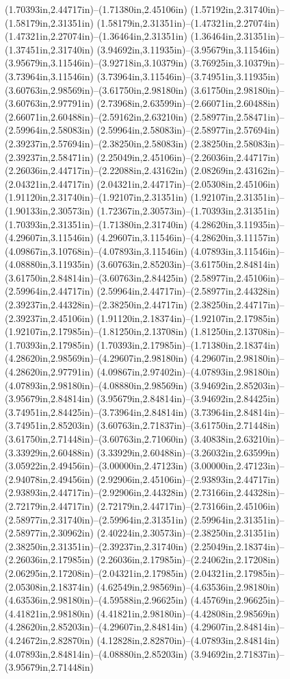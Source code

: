 (1.70393in,2.44717in)--(1.71380in,2.45106in) (1.57192in,2.31740in)--(1.58179in,2.31351in) (1.58179in,2.31351in)--(1.47321in,2.27074in) (1.47321in,2.27074in)--(1.36464in,2.31351in) (1.36464in,2.31351in)--(1.37451in,2.31740in) (3.94692in,3.11935in)--(3.95679in,3.11546in) (3.95679in,3.11546in)--(3.92718in,3.10379in) (3.76925in,3.10379in)--(3.73964in,3.11546in) (3.73964in,3.11546in)--(3.74951in,3.11935in) (3.60763in,2.98569in)--(3.61750in,2.98180in) (3.61750in,2.98180in)--(3.60763in,2.97791in) (2.73968in,2.63599in)--(2.66071in,2.60488in) (2.66071in,2.60488in)--(2.59162in,2.63210in) (2.58977in,2.58471in)--(2.59964in,2.58083in) (2.59964in,2.58083in)--(2.58977in,2.57694in) (2.39237in,2.57694in)--(2.38250in,2.58083in) (2.38250in,2.58083in)--(2.39237in,2.58471in) (2.25049in,2.45106in)--(2.26036in,2.44717in) (2.26036in,2.44717in)--(2.22088in,2.43162in) (2.08269in,2.43162in)--(2.04321in,2.44717in) (2.04321in,2.44717in)--(2.05308in,2.45106in) (1.91120in,2.31740in)--(1.92107in,2.31351in) (1.92107in,2.31351in)--(1.90133in,2.30573in) (1.72367in,2.30573in)--(1.70393in,2.31351in) (1.70393in,2.31351in)--(1.71380in,2.31740in) (4.28620in,3.11935in)--(4.29607in,3.11546in) (4.29607in,3.11546in)--(4.28620in,3.11157in) (4.09867in,3.10768in)--(4.07893in,3.11546in) (4.07893in,3.11546in)--(4.08880in,3.11935in) (3.60763in,2.85203in)--(3.61750in,2.84814in) (3.61750in,2.84814in)--(3.60763in,2.84425in) (2.58977in,2.45106in)--(2.59964in,2.44717in) (2.59964in,2.44717in)--(2.58977in,2.44328in) (2.39237in,2.44328in)--(2.38250in,2.44717in) (2.38250in,2.44717in)--(2.39237in,2.45106in) (1.91120in,2.18374in)--(1.92107in,2.17985in) (1.92107in,2.17985in)--(1.81250in,2.13708in) (1.81250in,2.13708in)--(1.70393in,2.17985in) (1.70393in,2.17985in)--(1.71380in,2.18374in) (4.28620in,2.98569in)--(4.29607in,2.98180in) (4.29607in,2.98180in)--(4.28620in,2.97791in) (4.09867in,2.97402in)--(4.07893in,2.98180in) (4.07893in,2.98180in)--(4.08880in,2.98569in) (3.94692in,2.85203in)--(3.95679in,2.84814in) (3.95679in,2.84814in)--(3.94692in,2.84425in) (3.74951in,2.84425in)--(3.73964in,2.84814in) (3.73964in,2.84814in)--(3.74951in,2.85203in) (3.60763in,2.71837in)--(3.61750in,2.71448in) (3.61750in,2.71448in)--(3.60763in,2.71060in) (3.40838in,2.63210in)--(3.33929in,2.60488in) (3.33929in,2.60488in)--(3.26032in,2.63599in) (3.05922in,2.49456in)--(3.00000in,2.47123in) (3.00000in,2.47123in)--(2.94078in,2.49456in) (2.92906in,2.45106in)--(2.93893in,2.44717in) (2.93893in,2.44717in)--(2.92906in,2.44328in) (2.73166in,2.44328in)--(2.72179in,2.44717in) (2.72179in,2.44717in)--(2.73166in,2.45106in) (2.58977in,2.31740in)--(2.59964in,2.31351in) (2.59964in,2.31351in)--(2.58977in,2.30962in) (2.40224in,2.30573in)--(2.38250in,2.31351in) (2.38250in,2.31351in)--(2.39237in,2.31740in) (2.25049in,2.18374in)--(2.26036in,2.17985in) (2.26036in,2.17985in)--(2.24062in,2.17208in) (2.06295in,2.17208in)--(2.04321in,2.17985in) (2.04321in,2.17985in)--(2.05308in,2.18374in) (4.62549in,2.98569in)--(4.63536in,2.98180in) (4.63536in,2.98180in)--(4.59588in,2.96625in) (4.45769in,2.96625in)--(4.41821in,2.98180in) (4.41821in,2.98180in)--(4.42808in,2.98569in) (4.28620in,2.85203in)--(4.29607in,2.84814in) (4.29607in,2.84814in)--(4.24672in,2.82870in) (4.12828in,2.82870in)--(4.07893in,2.84814in) (4.07893in,2.84814in)--(4.08880in,2.85203in) (3.94692in,2.71837in)--(3.95679in,2.71448in) 